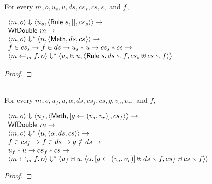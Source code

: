 \begin{lemma}
  \label{lem-inlinedmm-rule}
  \mbox{}\\
  For every $m, o, u_s, u, ds, cs_s, cs, s,$ and $f,$
  \begin{center}
    \begin{math}
      \begin{array}{l}
        \langle m, o \rangle \Downarrow \langle u_s, \langle \textsf{Rule}\ s, [], cs_s \rangle \rangle \to \\
        \textsf{WfDouble}\ m \to \\
        \langle m, o \rangle \Downarrow^{\ast} \langle u, \langle \textsf{Meth}, ds, cs \rangle \rangle \to \\
        f \in cs_s \to f \in ds \to u_s \ast u \to cs_s \ast cs \to \\
        \langle m \hookleftarrow_{m}{} f, o \rangle \Downarrow^{\ast} \langle u_s \uplus u, \langle \textsf{Rule}\ s, ds \smallsetminus{} f, cs_s \uplus cs \smallsetminus{} f \rangle \rangle
      \end{array}
    \end{math}
  \end{center}
\end{lemma}
\begin{proof}
\end{proof}

\begin{lemma}
  \label{lem-inlinedmm-meth1}
  \mbox{}\\
  For every $m, o, u_f, u, \alpha, ds, cs_f, cs, g, v_a, v_r,$ and $f,$
  \begin{center}
    \begin{math}
      \begin{array}{l}
        \langle m, o \rangle \Downarrow \langle u_f, \langle \textsf{Meth},  [ g \leftarrow (v_a, v_r) ], cs_f \rangle \rangle \to \\
        \textsf{WfDouble}\ m \to \\
        \langle m, o \rangle \Downarrow^{\ast} \langle u, \langle \alpha, ds, cs \rangle \rangle \to \\
        f \in cs_f \to f \in ds \to g \notin ds \to \\
        u_f \ast u \to cs_f \ast cs \to \\
        \langle m \hookleftarrow_{m}{} f, o \rangle \Downarrow^{\ast} \langle u_f \uplus u, \langle \alpha,  [ g \leftarrow (v_a, v_r) ] \uplus ds \smallsetminus{} f, cs_f \uplus cs \smallsetminus{} f \rangle \rangle
      \end{array}
    \end{math}
  \end{center}
\end{lemma}
\begin{proof}
\end{proof}

